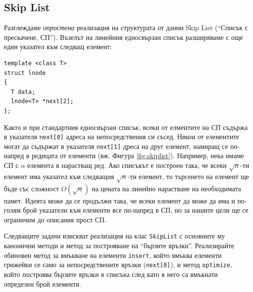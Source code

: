 \documentclass[12pt,a4paper]{article}
\newcommand{\code}[1]{\texttt{#1}}
\begin{document}
\subsection{Skip List}


\begin{mdframed}[hidealllines=true,backgroundcolor=gray!20]
Разглеждаме \emph{опростена} реализация на структурата от данни Skip List (``Списък с прескачене, СП''). Възелът на линейния едносвързан списък разширяваме с още един указател към следващ елемент:

\begin{verbatim}
template <class T>
struct lnode
{
  T data;
  lnode<T> *next[2];
};
\end{verbatim}
Както и при стандартния едносвързан списък, всеки от елментите на СП съдържа в указателя \code{next[0]} адреса на непосредствения си съсед. Някои от елементите могат да съдържат в указателя \code{next[1]} дреса на друг елемент, намиращ се по-напред в редицата от елементи (вж. Фигура \ref{fig:skiplist}). Например, нека имаме СП с $n$ елемента в нарастващ ред. Ако списъкът е построен така, че всеки $\sqrt{n}$-ти елемент има указател към следващия  $\sqrt{n}$-ти елемент, то търсенето на елемент ще бъде със сложност $O(\sqrt{n})$ на цената на линейно нарастване на необходимата памет. Идеята може да се продължи така, че всеки елемент да може да има и по-голям брой указатели към елементи все по-напред в СП, но за нашите цели ще се ограничим до описания прост СП.

Следващите задачи изискват реализация на клас \code{SkipList} с основните му канонични методи и метод за построяване на ``бързите връзки''. Реализирайте обиновен метод за вмъкване на елементи \code{insert}, който вмъква елементи грижейки се само за непосредствените връзки (\code{next[0]}), и метод \code{optimize}, който построява бързите връзки в списъка след като в него са вмъкнати определен брой елементи.
\end{mdframed}
\end{document}
